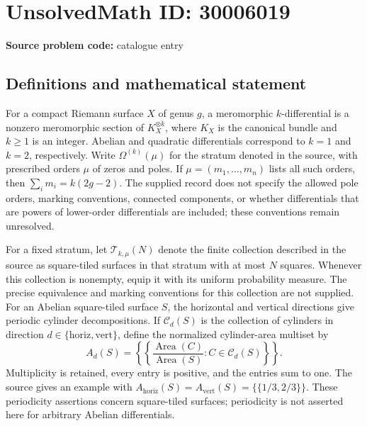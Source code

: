 \documentclass[11pt]{article}
\begin{document}
\section*{UnsolvedMath ID: 30006019}
\textbf{Source problem code:} catalogue entry
\subsection{Definitions and mathematical statement}
For a compact Riemann surface \(X\) of genus \(g\), a meromorphic \(k\)-differential is a nonzero meromorphic section of \(K_X^{\otimes k}\), where \(K_X\) is the canonical bundle and \(k\geq 1\) is an integer. Abelian and quadratic differentials correspond to \(k=1\) and \(k=2\), respectively. Write \(\Omega^{(k)}(\mu)\) for the stratum denoted in the source, with prescribed orders \(\mu\) of zeros and poles. If \(\mu=(m_1,\ldots,m_n)\) lists all such orders, then \(\sum_i m_i=k(2g-2)\). The supplied record does not specify the allowed pole orders, marking conventions, connected components, or whether differentials that are powers of lower-order differentials are included; these conventions remain unresolved.

For a fixed stratum, let \(\mathcal T_{k,\mu}(N)\) denote the finite collection described in the source as square-tiled surfaces in that stratum with at most \(N\) squares. Whenever this collection is nonempty, equip it with its uniform probability measure. The precise equivalence and marking conventions for this collection are not supplied. For an Abelian square-tiled surface \(S\), the horizontal and vertical directions give periodic cylinder decompositions. If \(\mathcal C_d(S)\) is the collection of cylinders in direction \(d\in\{\mathrm{horiz},\mathrm{vert}\}\), define the normalized cylinder-area multiset by
\[
 A_d(S)=\left\{\!\left\{
 \frac{\operatorname{Area}(C)}{\operatorname{Area}(S)}:
 C\in\mathcal C_d(S)
 \right\}\!\right\}.
\]
Multiplicity is retained, every entry is positive, and the entries sum to one. The source gives an example with \(A_{\mathrm{horiz}}(S)=A_{\mathrm{vert}}(S)=\{\!\{1/3,2/3\}\!\}\). These periodicity assertions concern square-tiled surfaces; periodicity is not asserted here for arbitrary Abelian differentials.
\end{document}

